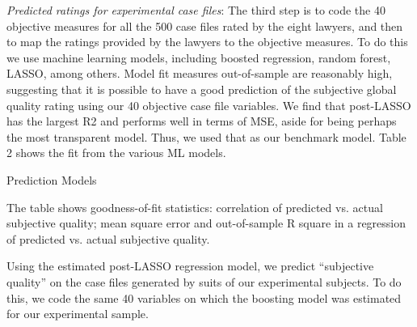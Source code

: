 \documentclass[oneside,12pt]{article}
\begin{document}
\emph{Predicted ratings for experimental case files}: The third step is to code the 40 objective measures for all the 500 case files rated by the eight lawyers, and then to map the ratings provided by the lawyers to the objective measures. To do this we use machine learning models, including boosted regression, random forest, LASSO, among others. Model fit measures out-of-sample are reasonably high, suggesting that it is possible to have a good prediction of the subjective global quality rating using our 40 objective case file variables. We find that post-LASSO has the largest R2 and performs well in terms of MSE, aside for being perhaps the most transparent model. Thus, we used that as our benchmark model. Table 2 shows the fit from the various ML models. 
\\

\begin{table}[!ht]
    \caption{Prediction Models}
    \label{tab:2_pred}
    \center
    \notesize{}
    \begin{figurenotes}
    The table shows goodness-of-fit statistics: correlation of predicted vs. actual subjective quality; mean square error and out-of-sample R square in a regression of predicted vs. actual subjective quality.
    \end{figurenotes}
  
\end{table}



Using the estimated post-LASSO regression model, we predict “subjective quality” on the case files generated by suits of our experimental subjects. To do this, we code the same 40 variables on which the boosting model was estimated for our experimental sample. 
\end{document}
